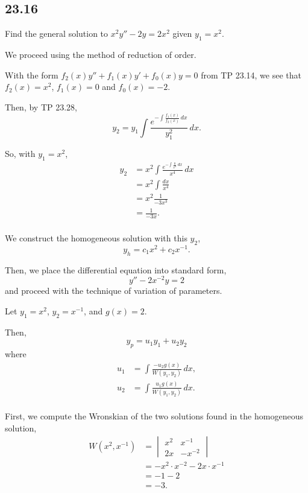 \documentclass[../hw6]{subfiles}
\begin{document}
\subsection*{23.16}

Find the general solution to $x^2y''-2y=2x^2$ given $y_1=x^2$.

We proceed using the method of reduction of order.

With the form $f_2(x)y''+f_1(x)y'+f_0(x)y=0$ from TP 23.14, 
we see that $f_2(x)=x^2$, $f_1(x)=0$ and $f_0(x)=-2$.

Then, by TP 23.28,
\[y_2=y_1\int\frac{e^{-\int\frac{f_1(x)}{f_2(x)}\,dx}}{y_1^2}\,dx.\]

So, with $y_1=x^2$,
\begin{align*}
    y_2&=x^2\int\frac{e^{-\int\frac{0}{x^2}\,dx}}{x^4}\,dx\\
    &=x^2\int\frac{dx}{x^4}\\
    &=x^2\frac{1}{-3x^3}\\
    &=\frac{1}{-3x}.\\
\end{align*}

We construct the homogeneous solution with this $y_2$,
\[y_h=c_1x^2+c_2x^{-1}.\]

Then, we place the differential equation into standard form,
\[y''-2x^{-2}y=2\]
and proceed with the technique of variation of parameters.

Let $y_1=x^2$, $y_2=x^{-1}$, and $g(x)=2$.

Then, \[y_p=u_1y_1+u_2y_2\] where
\begin{align*}
    u_1&=\int\frac{-u_2g(x)}{W(y_1,y_2)}\,dx,\\
    u_2&=\int\frac{u_1g(x)}{W(y_1,y_2)}\,dx.\\
\end{align*}

First, we compute the Wronskian of the two solutions found in the homogeneous solution,
\begin{align*}
    W(x^2, x^{-1}) &= \begin{vmatrix}
        x^2 & x^{-1} \\
        2x & -x^{-2}
    \end{vmatrix} \\
    &=-x^2\cdot x^{-2}-2x\cdot x^{-1} \\
    &= -1-2 \\
    &= -3. \\
\end{align*}
\end{document}

